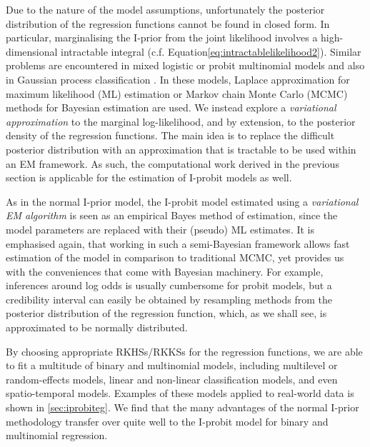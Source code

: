 \documentclass[showframe,11pt,twoside,openright]{report}
\begin{document}
Due to the nature of the model assumptions, unfortunately the posterior distribution of the regression functions cannot be found in closed form.
In particular, marginalising the I-prior from the joint likelihood involves a high-dimensional intractable integral (c.f. {\color{\mycitecolour}Equation}\ref{eq:intractablelikelihood2}).
Similar problems are encountered in mixed logistic or probit multinomial models \citep{breslow1993approximate,mcculloch2000bayesian} and also in Gaussian process classification \citep{neal1999,rasmussen2006gaussian}.
In these models, Laplace approximation for maximum likelihood (ML) estimation or Markov chain Monte Carlo (MCMC) methods for Bayesian estimation are used. 
We instead explore a \emph{variational approximation} to the marginal log-likelihood, and by extension, to the posterior density of the regression functions.
The main idea is to replace the difficult posterior distribution with an approximation that is tractable to be used within an EM framework.
As such, the computational work derived in the previous section is applicable for the estimation of I-probit models as well.

As in the normal I-prior model, the I-probit model estimated using a \emph{variational EM algorithm} is seen as an empirical Bayes method of estimation, since the model parameters are replaced with their (pseudo) ML estimates.
It is emphasised again, that working in such a semi-Bayesian framework allows fast estimation of the model in comparison to traditional MCMC, yet provides us with the conveniences that come with Bayesian machinery.
For example, inferences around log odds is usually cumbersome for probit models, but a credibility interval can easily be obtained by resampling methods from the posterior distribution of the regression function, which, as we shall see, is approximated to be normally distributed.

By choosing appropriate RKHSs/RKKSs for the regression functions, we are able to fit a multitude of binary and multinomial models, including multilevel or random-effects models, linear and non-linear classification models, and even spatio-temporal models.
Examples of these models applied to real-world data is shown in  \cref{sec:iprobiteg}.
We find that the many advantages of the normal I-prior methodology  transfer over quite well to the I-probit model for binary and multinomial regression.

%
\end{document}
